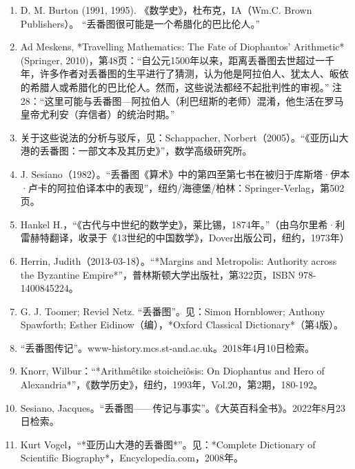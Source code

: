 \begin{enumerate}
\item D. M. Burton (1991, 1995). 《数学史》，杜布克，IA（Wm.C. Brown Publishers）。  
“丢番图很可能是一个希腊化的巴比伦人。”
\item Ad Meskens, *Travelling Mathematics: The Fate of Diophantos' Arithmetic* (Springer, 2010)，第48页：“自公元1500年以来，距离丢番图去世超过一千年，许多作者对丢番图的生平进行了猜测，认为他是阿拉伯人、犹太人、皈依的希腊人或希腊化的巴比伦人。然而，这些说法都经不起批判性的审视。” 注28：“这里可能与丢番图—阿拉伯人（利巴纽斯的老师）混淆，他生活在罗马皇帝尤利安（弃信者）的统治时期。”  
\item 关于这些说法的分析与驳斥，见：Schappacher, Norbert（2005）。“《亚历山大港的丢番图：一部文本及其历史》”，数学高级研究所。
\item J. Sesiano（1982）。“丢番图《算术》中的第四至第七书在被归于库斯塔·伊本·卢卡的阿拉伯译本中的表现”，纽约/海德堡/柏林：Springer-Verlag，第502页。  
\item Hankel H.，“《古代与中世纪的数学史》，莱比锡，1874年。”（由乌尔里希·利雷赫特翻译，收录于《13世纪的中国数学》，Dover出版公司，纽约，1973年）  
\item Herrin, Judith（2013-03-18）。“*Margins and Metropolis: Authority across the Byzantine Empire*”，普林斯顿大学出版社，第322页，ISBN 978-1400845224。  
\item G. J. Toomer; Reviel Netz. “丢番图”。见：Simon Hornblower; Anthony Spawforth; Esther Eidinow（编），*Oxford Classical Dictionary*（第4版）。  
\item “丢番图传记”。www-history.mcs.st-and.ac.uk。2018年4月10日检索。  
\item Knorr, Wilbur：“*Arithmêtike stoicheiôsis: On Diophantus and Hero of Alexandria*”，《数学历史》，纽约，1993年，Vol.20，第2期，180-192。  
\item Sesiano, Jacques。“丢番图——传记与事实”。《大英百科全书》。2022年8月23日检索。  
\item Kurt Vogel，“*亚历山大港的丢番图*”。见：*Complete Dictionary of Scientific Biography*，Encyclopedia.com，2008年。
\end{enumerate}
